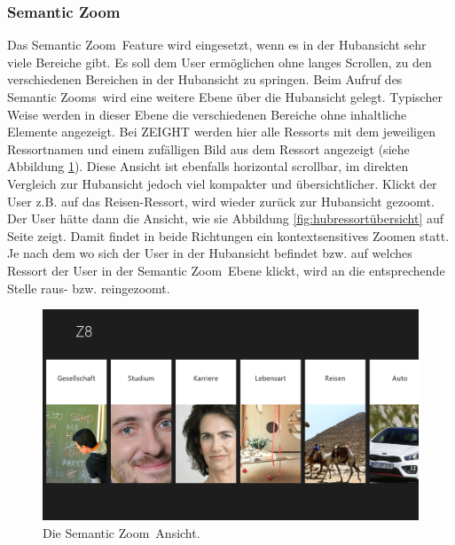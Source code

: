 \documentclass[12pt,a4paper,bibtotoc,abstracton]{scrartcl}
\begin{document}
\subsubsection{Semantic Zoom}
\label{subsubsec:semanticzoom}
Das \glqq Semantic Zoom\grqq\ Feature wird eingesetzt, wenn es in der Hubansicht sehr viele Bereiche gibt. Es soll dem User ermöglichen ohne langes Scrollen, zu den verschiedenen Bereichen in der Hubansicht zu springen. Beim Aufruf des \glqq Semantic Zooms\grqq\ wird eine weitere Ebene über die Hubansicht gelegt. Typischer Weise werden in dieser Ebene die verschiedenen Bereiche ohne inhaltliche Elemente angezeigt. Bei ZEIGHT werden hier alle Ressorts mit dem jeweiligen Ressortnamen und einem zufälligen Bild aus dem Ressort angezeigt (siehe Abbildung \ref{fig:semanticzoom}). Diese Ansicht ist ebenfalls horizontal scrollbar, im direkten Vergleich zur Hubansicht jedoch viel kompakter und übersichtlicher. Klickt der User z.B. auf das Reisen-Ressort, wird wieder zurück zur Hubansicht \glqq gezoomt\grqq. Der User hätte dann die Ansicht, wie sie Abbildung \ref{fig:hubressortübersicht} auf Seite \pageref{fig:hubressortübersicht} zeigt. Damit findet in beide Richtungen ein kontextsensitives Zoomen statt. Je nach dem wo sich der User in der Hubansicht befindet bzw. auf welches Ressort der User in der \glqq Semantic Zoom\grqq\ Ebene klickt, wird an die entsprechende Stelle raus- bzw. reingezoomt.  

\begin{figure}[h]
	\centering
	\includegraphics[width=\textwidth]{Bilder/Screenshots/app/reise_aegypten_1zoom.png} 
	\caption[Die Semantic Zoom Ansicht]{Die \glqq Semantic Zoom\grqq\ Ansicht.}
	\label{fig:semanticzoom}
\end{figure}  
\end{document}
